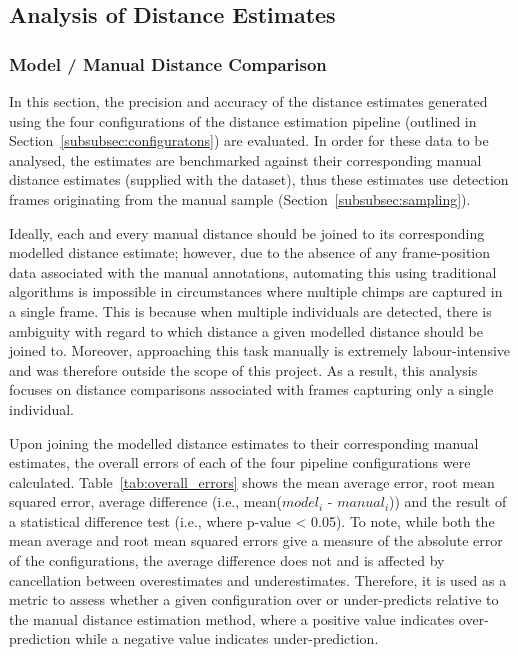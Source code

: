 \subsection{Analysis of Distance Estimates}

\subsubsection{Model / Manual Distance Comparison}\label{subsubsec:distance_comparison}

In this section, the precision and accuracy of the distance estimates generated using the
four configurations of the distance estimation pipeline (outlined in
Section~\ref{subsubsec:configuratons}) are evaluated.
In order for these data to be analysed, the estimates are benchmarked against their
corresponding manual distance estimates (supplied with the dataset), thus these estimates
use detection frames originating from the manual sample (Section~\ref{subsubsec:sampling}).

Ideally, each and every manual distance should be joined to its corresponding modelled
distance estimate; however, due to the absence of any frame-position data associated
with the manual annotations, automating this using traditional algorithms is impossible
in circumstances where multiple chimps are captured in a single frame.
This is because when multiple individuals are detected, there is ambiguity with regard to
which distance a given modelled distance should be joined to.
Moreover, approaching this task manually is extremely labour-intensive and was therefore
outside the scope of this project.
As a result, this analysis focuses on distance comparisons associated with frames capturing
only a single individual.

Upon joining the modelled distance estimates to their corresponding manual estimates, the
overall errors of each of the four pipeline configurations were calculated.
Table~\ref{tab:overall_errors} shows the mean average error, root mean squared error,
average difference (i.e., mean($model_i$ - $manual_i$)) and the result of a statistical
difference test (i.e., where p-value < 0.05).
To note, while both the mean average and root mean squared errors give a measure of the
absolute error of the configurations, the average difference does not and is affected by
cancellation between overestimates and underestimates.
Therefore, it is used as a metric to assess whether a given configuration over or
under-predicts relative to the manual distance estimation method, where a positive value
indicates over-prediction while a negative value indicates under-prediction.

